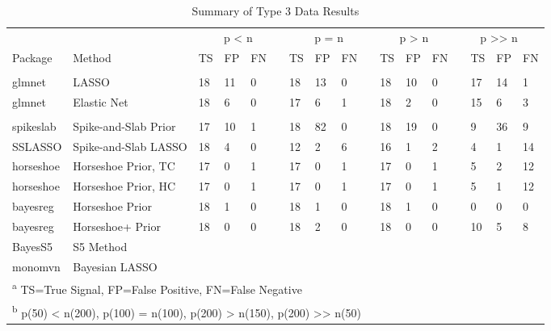 \documentclass[
  11pt,
]{article}
\begin{document}
\begin{table}[!h]

\caption{\label{tab:Results T3}Summary of Type 3 Data Results}
\centering
\fontsize{8.5}{10.5}\selectfont
\begin{tabular}[t]{>{}l|>{}l|>{}l|>{}l|>{}l|>{}l|>{}l|>{}l|>{}l|>{}l|>{}l|>{}l|>{}l|>{}l|>{}l|>{}l|>{}l|}
\toprule
\multicolumn{2}{c}{ } & \multicolumn{4}{c}{p < n} & \multicolumn{4}{c}{p = n} & \multicolumn{3}{c}{p > n} & \multicolumn{4}{c}{p >> n} \\
\cmidrule(l{3pt}r{3pt}){3-6} \cmidrule(l{3pt}r{3pt}){7-10} \cmidrule(l{3pt}r{3pt}){11-13} \cmidrule(l{3pt}r{3pt}){14-17}
Package & Method & TS & FP & FN &  & TS & FP & FN &  & TS & FP & FN &  & TS & FP & FN\\
\midrule
\addlinespace[0.3em]
\multicolumn{17}{l}{\textbf{Frequentist Methods}}\\
\hspace{1em}glmnet & LASSO & 18 & 11 & 0 &  & 18 & 13 & 0 &  & 18 & 10 & 0 &  & 17 & 14 & 1\\
\hspace{1em}glmnet & Elastic Net & 18 & 6 & 0 &  & 17 & 6 & 1 &  & 18 & 2 & 0 &  & 15 & 6 & 3\\
\addlinespace[0.3em]
\multicolumn{17}{l}{\textbf{Bayesian Methods}}\\
\hspace{1em}spikeslab & Spike-and-Slab Prior & 17 & 10 & 1 &  & 18 & 82 & 0 &  & 18 & 19 & 0 &  & 9 & 36 & 9\\
\hspace{1em}SSLASSO & Spike-and-Slab LASSO & 18 & 4 & 0 &  & 12 & 2 & 6 &  & 16 & 1 & 2 &  & 4 & 1 & 14\\
\hspace{1em}horseshoe & Horseshoe Prior, TC & 17 & 0 & 1 &  & 17 & 0 & 1 &  & 17 & 0 & 1 &  & 5 & 2 & 12\\
\hspace{1em}horseshoe & Horseshoe Prior, HC & 17 & 0 & 1 &  & 17 & 0 & 1 &  & 17 & 0 & 1 &  & 5 & 1 & 12\\
\hspace{1em}bayesreg & Horseshoe Prior & 18 & 1 & 0 &  & 18 & 1 & 0 &  & 18 & 1 & 0 &  & 0 & 0 & 0\\
\hspace{1em}bayesreg & Horseshoe+ Prior & 18 & 0 & 0 &  & 18 & 2 & 0 &  & 18 & 0 & 0 &  & 10 & 5 & 8\\
\hspace{1em}BayesS5 & S5 Method &  &  &  &  &  &  &  &  &  &  &  &  &  &  & \\
\hspace{1em}monomvn & Bayesian LASSO &  &  &  &  &  &  &  &  &  &  &  &  &  &  & \\
\bottomrule
\multicolumn{17}{l}{\textsuperscript{a} TS=True Signal, FP=False Positive, FN=False Negative}\\
\multicolumn{17}{l}{\textsuperscript{b} p(50) < n(200), p(100) = n(100), p(200) > n(150), p(200) >> n(50)}\\
\end{tabular}
\end{table}
\end{document}
